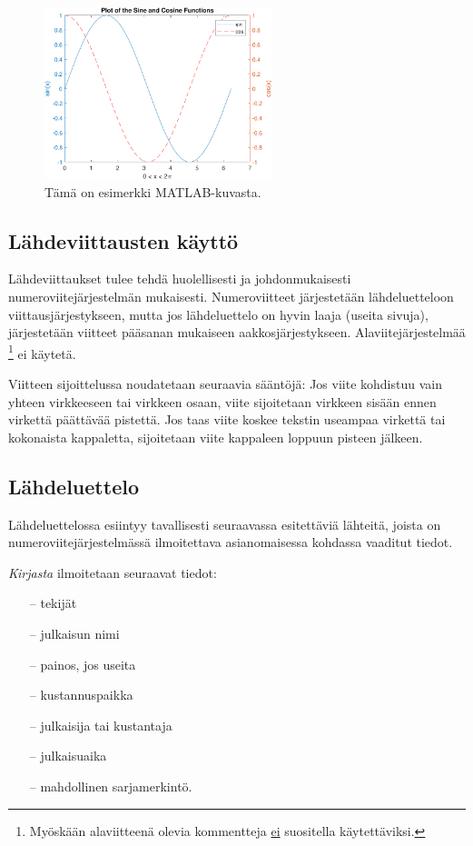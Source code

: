 \documentclass[finnish, 12pt, a4paper, elec, utf8, a-1b, online]{aaltothesis}
\begin{document}
\begin{figure}[htb]
\centering
\includegraphics[height=5cm]{images/curves.pdf}
\caption{Tämä on esimerkki MATLAB-kuvasta. \label{kuva2}}
\end{figure}


\subsection*{Lähdeviittausten käyttö}

Lähdeviittaukset tulee tehdä huolellisesti ja johdonmukaisesti
numeroviitejärjestelmän mukaisesti. Numeroviitteet järjestetään
lähdeluetteloon viittausjärjestykseen, mutta jos lähdeluettelo
on hyvin laaja (useita sivuja), järjestetään viitteet pääsanan
mukaiseen aakkosjärjestykseen. Alaviitejärjestelmää
\footnote{Myöskään alaviitteenä olevia kommentteja \underline{ei} suositella
käytettäviksi.} ei käytetä.

Viitteen sijoittelussa noudatetaan seuraavia sääntöjä:
Jos viite kohdistuu vain yhteen virkkeeseen tai virkkeen
osaan, viite \cite{Kauranen} sijoitetaan virkkeen sisään ennen virkettä
päättävää pistettä. Jos taas viite koskee tekstin useampaa
virkettä tai kokonaista kappaletta, sijoitetaan viite kappaleen loppuun
pisteen jälkeen. \cite{Kauranen}

\subsection*{Lähdeluettelo}

Lähdeluettelossa esiintyy tavallisesti seuraavassa esitettäviä
lähteitä, joista on numeroviitejärjestelmässä ilmoitettava
asianomaisessa kohdassa vaaditut tiedot.

\textit{Kirjasta} ilmoitetaan seuraavat tiedot:

\begin{itemize}
\item[--]tekijät
\item[--]julkaisun nimi
\item[--]painos, jos useita
\item[--]kustannuspaikka
\item[--]julkaisija tai kustantaja
\item[--]julkaisuaika
\item[--]mahdollinen sarjamerkintö.
\end{itemize}
\end{document}
